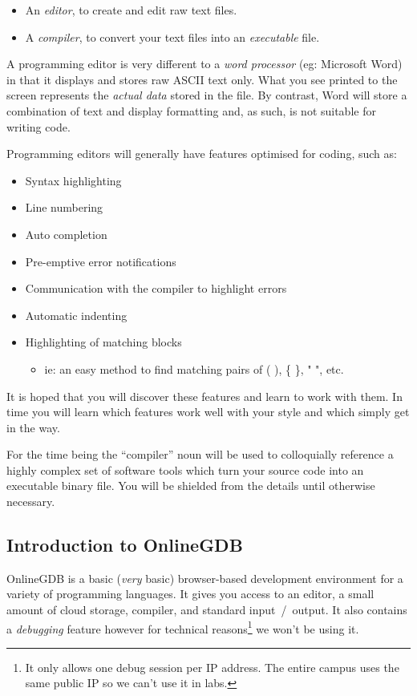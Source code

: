 \documentclass{lab}
\begin{document}
\begin{itemize}
\item An \textit{editor}, to create and edit raw text files.
\item A \textit{compiler}, to convert your text files into an \textit{executable} file.
\end{itemize}

A programming editor is very different to a \textit{word processor} (eg: Microsoft Word) in that it displays and stores raw ASCII text only. What you see printed to the screen represents the \textit{actual data} stored in the file. By contrast, Word will store a combination of text and display formatting and, as such, is not suitable for writing code.

Programming editors will generally have features optimised for coding, such as:

\begin{itemize}
\item Syntax highlighting
\item Line numbering
\item Auto completion
\item Pre-emptive error notifications
\item Communication with the compiler to highlight errors
\item Automatic indenting
\item Highlighting of matching blocks 
	\begin{itemize}
		\item ie: an easy method to find matching pairs of ( ), \{ \}, " ", etc.
	\end{itemize}
\end{itemize}

It is hoped that you will discover these features and learn to work with them. In time you will learn which features work well with your style and which simply get in the way.

For the time being the ``compiler'' noun will be used to colloquially reference a highly complex set of software tools which turn your source code into an executable binary file. You will be shielded from the details until otherwise necessary.

\subsection{Introduction to OnlineGDB}

OnlineGDB is a basic (\textit{very} basic) browser-based development environment for a variety of programming languages. It gives you access to an editor, a small amount of cloud storage, compiler, and standard input~/~output. It also contains a \textit{debugging} feature however for technical reasons\footnote{It only allows one debug session per IP address. The entire campus uses the same public IP so we can't use it in labs.} we won't be using it.
\end{document}
